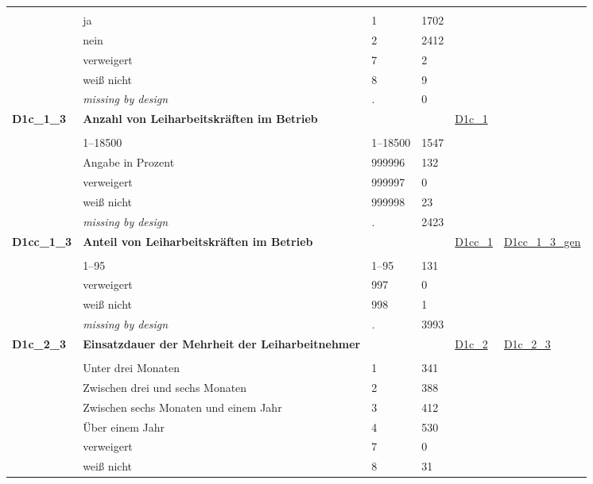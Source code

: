 \begin{longtable}{| L{2.45cm} | L{6cm} | C{1.5cm} | R{1cm} | C{2.25cm} | C{2.25cm} |}
   &  &  &  &  &  \\ 
   & ja & 1 & 1702 &  &  \\ 
   & nein & 2 & 2412 &  &  \\ 
   & verweigert & 7 & 2 &  &  \\ 
   & weiß nicht & 8 & 9 &  &  \\ 
   & \textit{missing by design} & \textit{.} & 0 &  &  \\ 
   \midrule
\textbf{D1c\_1\_3}\label{var:D1c:1:3} & \textbf{Anzahl von Leiharbeitskräften im Betrieb} &  &  & \hyperref[D1c:1]{D1c\_1} & \hyperref[var:suf:]{} \\ 
   &  &  &  &  &  \\ 
   & 1--18500 & 1--18500 & 1547 &  &  \\ 
   & Angabe in Prozent & 999996 & 132 &  &  \\ 
   & verweigert & 999997 & 0 &  &  \\ 
   & weiß nicht & 999998 & 23 &  &  \\ 
   & \textit{missing by design} & \textit{.} & 2423 &  &  \\ 
   \midrule
\textbf{D1cc\_1\_3}\label{var:D1cc:1:3} & \textbf{Anteil von Leiharbeitskräften im Betrieb} &  &  & \hyperref[D1cc:1]{D1cc\_1} & \hyperref[var:suf:D1cc:1:3:gen]{D1cc\_1\_3\_gen} \\ 
   &  &  &  &  &  \\ 
   & 1--95 & 1--95 & 131 &  &  \\ 
   & verweigert & 997 & 0 &  &  \\ 
   & weiß nicht & 998 & 1 &  &  \\ 
   & \textit{missing by design} & \textit{.} & 3993 &  &  \\ 
   \midrule
\textbf{D1c\_2\_3}\label{var:D1c:2:3} & \textbf{Einsatzdauer der Mehrheit der Leiharbeitnehmer} &  &  & \hyperref[D1c:2]{D1c\_2} & \hyperref[var:suf:D1c:2:3]{D1c\_2\_3} \\ 
   &  &  &  &  &  \\ 
   & Unter drei Monaten & 1 & 341 &  &  \\ 
   & Zwischen drei und sechs Monaten & 2 & 388 &  &  \\ 
   & Zwischen sechs Monaten und einem Jahr & 3 & 412 &  &  \\ 
   & Über einem Jahr & 4 & 530 &  &  \\ 
   & verweigert & 7 & 0 &  &  \\ 
   & weiß nicht & 8 & 31 &  &  \\ 

\end{longtable}
